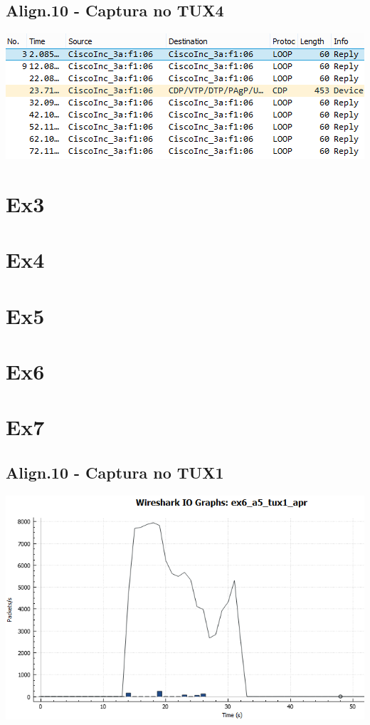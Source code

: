 \documentclass[11pt,a4paper,reqno]{report}
\numberwithin{equation}{section}
\begin{document}
\begin{appendices}
\subsection{Align.10 - Captura no TUX4}
\includegraphics[width=18cm]{ex2_a10_tux4.png}

\section{Ex3}

\section{Ex4}

\section{Ex5}

\section{Ex6}

\section{Ex7}

\subsection{Align.10 - Captura no TUX1}
\includegraphics[width=18cm]{ex6_a5_tux1_IO.png}

\end{appendices}
\end{document}
